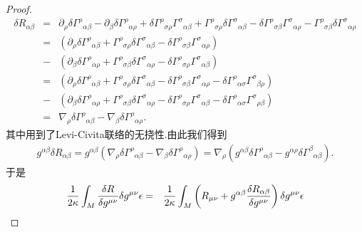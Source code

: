 \begin{proof}
\begin{eqnarray*}
        \delta{R}_{\alpha\beta}&=&\partial_\rho\delta{\varGamma^\rho}_{\alpha\beta}-\partial_\beta\delta{\varGamma^\rho}_{\alpha\rho}+\delta{\varGamma^\rho}_{\sigma\rho}{\varGamma^\sigma}_{\alpha\beta}+{\varGamma^\rho}_{\sigma\rho}\delta{\varGamma^\sigma}_{\alpha\beta}-\delta{\varGamma^\rho}_{\sigma\beta}{\varGamma^\sigma}_{\alpha\rho}-{\varGamma^\rho}_{\sigma\beta}\delta{\varGamma^\sigma}_{\alpha\rho}\\
        &=&\left(\partial_\rho\delta{\varGamma^\rho}_{\alpha\beta}+{\varGamma^\rho}_{\sigma\rho}\delta{\varGamma^\sigma}_{\alpha\beta}-\delta{\varGamma^\rho}_{\sigma\beta}{\varGamma^\sigma}_{\alpha\rho}\right)\\
        &-&\left(\partial_\beta\delta{\varGamma^\rho}_{\alpha\rho}+{\varGamma^\rho}_{\sigma\beta}\delta{\varGamma^\sigma}_{\alpha\rho}-\delta{\varGamma^\rho}_{\sigma\rho}{\varGamma^\sigma}_{\alpha\beta}\right)\\
        &=&\left(\partial_\rho\delta{\varGamma^\rho}_{\alpha\beta}+{\varGamma^\rho}_{\sigma\rho}\delta{\varGamma^\sigma}_{\alpha\beta}-\delta{\varGamma^\rho}_{\sigma\beta}{\varGamma^\sigma}_{\alpha\rho}-\delta{\varGamma^\rho}_{\alpha\sigma}{\varGamma^\sigma}_{\beta\rho}\right)\\
        &-&\left(\partial_\beta\delta{\varGamma^\rho}_{\alpha\rho}+{\varGamma^\rho}_{\sigma\beta}\delta{\varGamma^\sigma}_{\alpha\rho}-\delta{\varGamma^\rho}_{\sigma\rho}{\varGamma^\sigma}_{\alpha\beta}-\delta{\varGamma^\rho}_{\alpha\sigma}{\varGamma^\sigma}_{\rho\beta}\right)\\
        &=&\nabla_\rho\delta{\varGamma^\rho}_{\alpha\beta}-\nabla_\beta\delta{\varGamma^\rho}_{\alpha\rho}.
    \end{eqnarray*}
    其中用到了Levi-Civita联络的无挠性.由此我们得到
    \begin{eqnarray*}
        g^{\alpha\beta}\delta{R}_{\alpha\beta}=g^{\alpha\beta}\left(\nabla_\rho\delta{\varGamma^\rho}_{\alpha\beta}-\nabla_\beta\delta{\varGamma^\rho}_{\alpha\rho}\right)=\nabla_\rho\left(g^{\alpha\beta}\delta{\varGamma^\rho}_{\alpha\beta}-g^{\alpha\rho}\delta{\varGamma^\beta}_{\alpha\beta}\right).
    \end{eqnarray*}
    于是
    \begin{eqnarray}\label{eq:delta EHA 1}
        \frac{1}{2\kappa}\int_M\frac{\delta R}{\delta g^{\mu\nu}}\delta g^{\mu\nu}\epsilon&=&\frac{1}{2\kappa}\int_M\left({R}_{\mu\nu}+g^{\alpha\beta}\frac{\delta {R}_{\alpha\beta}}{\delta g^{\mu\nu}}\right)\delta g^{\mu\nu}\epsilon\notag\\

\end{eqnarray}
\end{proof}
